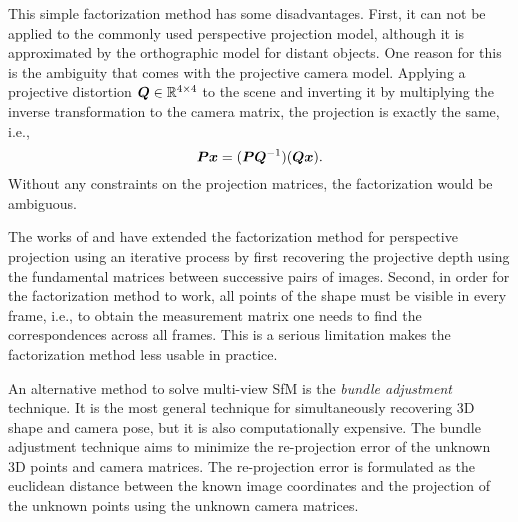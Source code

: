 			This simple factorization method has some disadvantages.
			First, it can not be applied to the commonly used perspective projection model, although it is approximated by the orthographic model for distant objects.
			One reason for this is the ambiguity that comes with the projective camera model.
			Applying a projective distortion $\bm{Q} \in \mathbb{R}^{4 \times 4}$ to the scene and inverting it by multiplying the inverse transformation to the camera matrix, the projection is exactly the same, i.e., 
			\begin{equation}\label{eq:projective_ambiguity}
				\bm{P} \bm{x} = (\bm{P} \bm{Q}^{-1}) (\bm{Q} \bm{x}).
			\end{equation}
			Without any constraints on the projection matrices, the factorization would be ambiguous.
			
			The works of \cite{sturm1996factorization} and \cite{christy1996euclidean} have extended the factorization method for perspective projection using an iterative process by first recovering the projective depth using the fundamental matrices between successive pairs of images.
			Second, in order for the factorization method to work, all points of the shape must be visible in every frame, i.e., to obtain the measurement matrix one needs to find the correspondences across all frames.
			This is a serious limitation makes the factorization method less usable in practice.
			
			An alternative method to solve multi-view SfM is the \emph{bundle adjustment} technique.
			It is the most general technique for simultaneously recovering 3D shape and camera pose, but it is also computationally expensive.
			The bundle adjustment technique aims to minimize the re-projection error of the unknown 3D points and camera matrices.
			The re-projection error is formulated as the euclidean distance between the known image coordinates and the projection of the unknown points using the unknown camera matrices.
			
